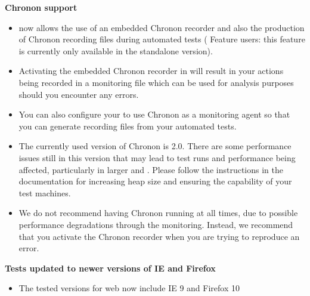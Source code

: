 \textbf{Chronon support}
\begin{itemize}
\item \app{} now allows the use of an embedded Chronon recorder and also the production of Chronon recording files during automated tests (\jb{} Feature users: this feature is currently only available in the standalone version). 
\item Activating the embedded Chronon recorder in \app{} will result in your actions being recorded in a monitoring file which can be used for analysis purposes should you encounter any errors.
\item You can also configure your \gdaut{} to use Chronon as a monitoring agent so that you can generate recording files from your automated tests. 
\item The currently used version of Chronon is 2.0. There are some performance issues still in this version that may lead to test runs and performance being affected, particularly in larger \gdauts{} and \gdprojects{}. Please follow the instructions in the documentation for increasing heap size and ensuring the capability of your test machines. 
\item We do not recommend having Chronon running at all times, due to possible performance degradations through the monitoring. Instead, we recommend that you activate the Chronon recorder when you are trying to reproduce an error.
\end{itemize}

\textbf{Tests updated to newer versions of IE and Firefox}
\begin{itemize}
\item The tested versions for web \gdauts{} now include IE 9 and Firefox 10
\end{itemize}


